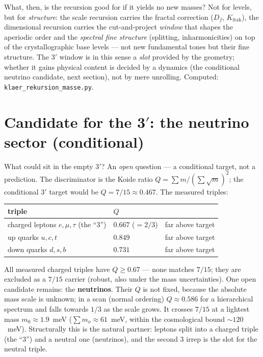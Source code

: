 What, then, is the recursion good for if it yields no new masses? Not for levels, but for
\emph{structure}: the scale recursion carries the fractal correction ($D_f$, $K_{\text{frak}}$), the
dimensional recursion carries the cut-and-project \emph{window} that shapes the aperiodic order and
the \emph{spectral fine structure} (splitting, inharmonicities) on top of the crystallographic base
levels --- not new fundamental tones but their fine structure. The $3'$ window is in this sense a
\emph{slot} provided by the geometry; whether it gains physical content is decided by a dynamics
(the conditional neutrino candidate, next section), not by mere unrolling. Computed:
\texttt{klaer\_rekursion\_masse.py}.

\section{Candidate for the 3$'$: the neutrino sector (conditional)}
What could sit in the empty 3$'$? An \emph{open} question --- a conditional target, not a
prediction. The discriminator is the Koide ratio $Q=\sum m/(\sum\sqrt m)^2$; the conditional
3$'$ target would be $Q=7/15\approx0.467$. The measured triples:

\begin{center}\small\renewcommand{\arraystretch}{1.2}
\begin{tabular}{@{}p{5.6cm} p{2.6cm} p{3.4cm}@{}}
\toprule
triple & $Q$ & \\
\midrule
charged leptons $e,\mu,\tau$ (the \enquote{$3$}) & $0.667$ ($=2/3$) & far above target \\
up quarks $u,c,t$ & $0.849$ & far above target \\
down quarks $d,s,b$ & $0.731$ & far above target \\
\bottomrule
\end{tabular}
\end{center}

\noindent All measured charged triples have $Q\ge0.67$ --- none matches $7/15$; they are
excluded as a $7/15$ carrier (robust, also under the mass uncertainties). One open candidate
remains: the \textbf{neutrinos}. Their $Q$ is not fixed, because the absolute mass scale is
unknown; in a scan (normal ordering) $Q\approx0.586$ for a hierarchical spectrum and falls
towards $1/3$ as the scale grows. It crosses $7/15$ at a lightest mass $m_0\approx1.9$~meV
($\sum m_\nu\approx61$~meV, within the cosmological bound $\sim120$~meV). Structurally this is
the natural partner: leptons split into a charged triple (the \enquote{$3$}) and a neutral one
(neutrinos), and the second $3$ irrep is the slot for the neutral triple.


